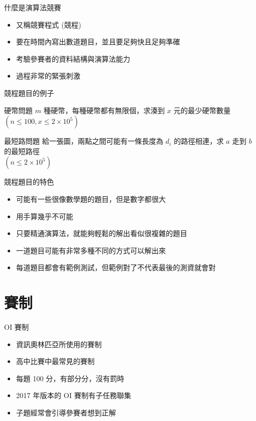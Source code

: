 \documentclass[aspectratio=169]{beamer}
\begin{document}
    \begin{frame}{什麼是演算法競賽}
    	\begin{itemize}
    		\item<1-> 又稱競賽程式 (競程)
    		\item<2-> 要在時間內寫出數道題目，並且要足夠快且足夠準確
    		\item<3-> 考驗參賽者的資料結構與演算法能力
    		\item<4-> 過程非常的緊張刺激
    	\end{itemize}
    \end{frame}
    
    \begin{frame}{競程題目的例子}
    	\begin{block}{硬幣問題}
    		$m$ 種硬幣，每種硬幣都有無限個，求湊到 $x$ 元的最少硬幣數量\\
    		$(n \le 100, x \le 2 \times 10^5)$
    	\end{block}
    	
    	\begin{block}{最短路問題}
    		給一張圖，兩點之間可能有一條長度為 $d_i$ 的路徑相連，求 $a$ 走到 $b$ 的最短路徑\\
    		$(n \le 2 \times 10^5)$
    	\end{block}	
    \end{frame}
    
    
    \begin{frame}{競程題目的特色}
    	\begin{itemize}
    		\item<1-> 可能有一些很像數學題的題目，但是數字都很大
    		\item<2-> 用手算幾乎不可能
    		\item<3-> 只要精通演算法，就能夠輕鬆的解出看似很複雜的題目
    		\item<4-> 一道題目可能有非常多種不同的方式可以解出來
    		\item<5-> 每道題目都會有範例測試，但範例對了不代表最後的測資就會對
    	\end{itemize}
    \end{frame}
    
	\section{賽制}    
    
    \begin{frame}{OI 賽制}
    	\begin{itemize}
    		\item<1-> 資訊奧林匹亞所使用的賽制
    		\item<2-> 高中比賽中最常見的賽制
    		\item<3-> 每題 100 分，有部分分，沒有罰時
    		\item<4-> 2017 年版本的 OI 賽制有子任務聯集
    		\item<5-> 子題經常會引導參賽者想到正解
    	\end{itemize}
    \end{frame}
    
\end{document}
